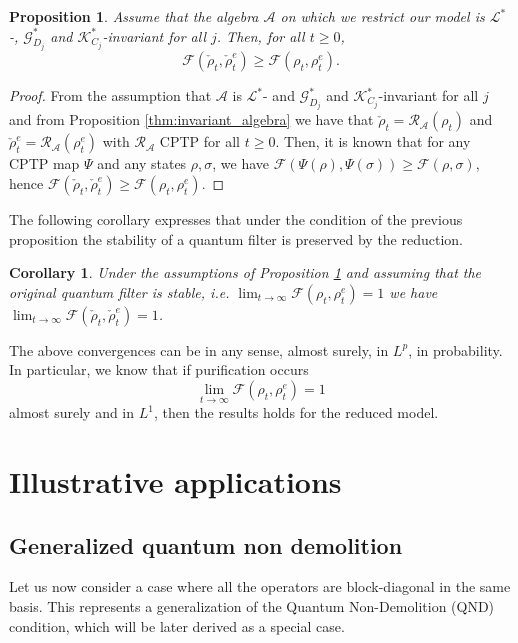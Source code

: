 \documentclass[aihp,12pt]{imsart}
\newcommand{\Gc}{\mathcal{G}}
\newcommand{\Rc}{\mathcal{R}}
\newcommand{\Kc}{\mathcal{K}}
\newcommand{\Lc}{\mathcal{L}}
\newcommand{\As}{\mathscr{A}}
\newcommand{\Fs}{\mathscr{F}}
\theoremstyle{theorem}
\newtheorem{proposition}{Proposition}
\newtheorem{corollary}{Corollary}
\theoremstyle{definition}
\theoremstyle{remark}
\begin{document}
\begin{proposition}
\label{prop:filter_stability}
    Assume that the algebra $\As$ on which we restrict our model is $\Lc^*$-, $\Gc_{D_j}^*$ and $\Kc_{C_j}^*$-invariant for all $j$. Then, for all $t\geq 0$, $$\Fs(\check{\rho}_t,\check{\rho}_t^e)\geq\Fs(\rho_t,\rho_t^e).$$
\end{proposition}
\begin{proof}
From the assumption that $\As$ is $\Lc^*$- and $\Gc_{D_j}^*$ and $\Kc_{C_j}^*$-invariant for all $j$ and from Proposition \ref{thm:invariant_algebra} we have that $\check{\rho}_t=\Rc_\As(\rho_t)$ and $\check{\rho}_t^e=\Rc_\As(\rho_t^e)$ with $\Rc_\As$ CPTP for all $t\geq0$. Then, it is known that for any CPTP map $\Psi$ and any states $\rho,\sigma$, we have $\Fs(\Psi(\rho),\Psi(\sigma))\geq \Fs(\rho,\sigma)$, hence $\Fs(\check{\rho}_t,\check{\rho}_t^e)\geq\Fs(\rho_t,\rho_t^e)$.
\end{proof}

The following corollary expresses that under the condition of the previous proposition the stability of a quantum filter is preserved by the reduction.

\begin{corollary}
Under the assumptions of Proposition \ref{prop:filter_stability} and assuming that the original quantum filter is stable, i.e. $\lim_{t\to\infty}\Fs(\rho_t,\rho_t^e) =1$ we have $\lim_{t\to\infty}\Fs(\check{\rho}_t,\check{\rho}_t^e)=1$.
\end{corollary}

The above convergences can be in any sense, almost surely, in $L^p$, in probability. In particular, we know that if purification occurs
$$\lim_{t\to\infty} \Fs(\rho_t,\rho^{e}_t)=1$$
almost surely and in $L^1$\cite{amini2021asymptotic}, then the results holds for the reduced model.


\section{Illustrative applications}
\label{sec:examples}
\subsection{Generalized quantum non demolition}\label{sec:qnd}
Let us now consider a case where all the operators are block-diagonal in the same basis. This represents a generalization of the Quantum Non-Demolition (QND) condition, which will be later derived as a special case. 
\end{document}
